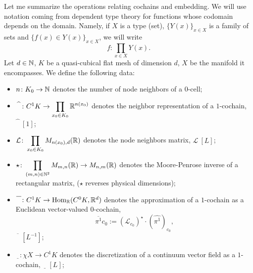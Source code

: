 \begin{discussion}
  Let me summarize the operations relating cochains and embedding.
  We will use notation coming from dependent type theory for functions whose
  codomain depends on the domain.
  Namely, if
    $X$ is a type (set),
    $\{Y(x)\}_{x \in X}$ is a family of sets and
    $\{f(x) \in Y(x)\}_{x \in X}$,
  we will write
  \begin{equation}
    f \colon \prod_{x \in X} Y(x).
  \end{equation}
  Let
    $d \in \mathbb{N}$,
    $K$ be a quasi-cubical flat mesh of dimension $d$,
    $X$ be the manifold it encompasses.
  We define the following data:
  \begin{itemize}
    \item
      $n \colon K_0 \to \mathbb{N}$ denotes the number of node neighbors of a $0$-cell;
    \item
      $\widehat{\phantom{T}} \colon C^1 K \to
        \displaystyle \prod_{x_0 \in K_0} \mathbb{R}^{n(x_0)}$
      denotes the neighbor representation of a $1$-cochain,
      $\widehat{\phantom{T}}\ [1]$;
    \item
      $\displaystyle
        \mathcal{L} \colon \prod_{x_0 \in K_0} M_{n(x_0), d}(\mathbb{R})$
      denotes the node neighbors matrix,
      $\mathcal{L}\ [L]$;
    \item
      $\displaystyle
        \star \colon \prod_{(m, n) \in \mathbb{N}^2} M_{m, n}(\mathbb{R}) \to M_{n, m}(\mathbb{R})$
      denotes the Moore-Penrose inverse of a rectangular matrix,
      ($\star$ reverses physical dimensions);
    \item
      $\overline{\phantom{T}} \colon C^1 K \to \mathop{\rm Hom}\nolimits_{\mathbb{R}}(C^0 K, \mathbb{R}^d)$
      denotes the approximation of a $1$-cochain as a Euclidean vector-valued
      $0$-cochain,
      \begin{equation}
        \overline{\pi^1} c_0 :=
        (\mathcal{L}_{c_0})^\star \cdot (\widehat{\pi^1})_{c_0},
      \end{equation}
      $\overline{\phantom{T}}\ [L^{-1}]$;
    \item
      $\underline{\phantom{T}} \colon \chi X \to C^1 K$
      denotes the discretization of a continuum vector field as a $1$-cochain,
      $\underline{\phantom{T}}\ [L]$;
  \end{itemize}
\end{discussion}
